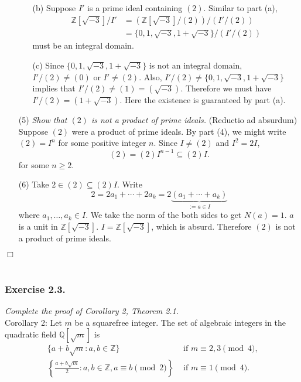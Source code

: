\documentclass{article}
\begin{document}
\begin{enumerate}
\begin{enumerate}
  \item[(b)]
    Suppose $I'$ is a prime ideal containing $(2)$.
    Similar to part (a),
    \begin{align*}
      \mathbb{Z}[\sqrt{-3}]/I'
      &= (\mathbb{Z}[\sqrt{-3}]/(2)) / (I'/(2)) \\
      &= \{ 0, 1, \sqrt{-3}, 1+\sqrt{-3} \} / (I'/(2))
    \end{align*}
    must be an integral domain.

  \item[(c)]
    Since $\{ 0, 1, \sqrt{-3}, 1+\sqrt{-3} \}$ is not an integral domain,
    $I'/(2) \neq (0)$ or $I' \neq (2)$.
    Also, $I'/(2) \neq \{ 0, 1, \sqrt{-3}, 1+\sqrt{-3} \}$ implies that
    $I'/(2) \neq (1) = (\sqrt{-3})$.
    Therefore we must have $I'/(2) = (1+\sqrt{-3})$.
    Here the existence is guaranteed by part (a).
  \end{enumerate}

\item[(5)]
\emph{Show that $(2)$ is not a product of prime ideals.}
  (Reductio ad absurdum)
  Suppose $(2)$ were a product of prime ideals.
  By part (4), we might write $(2) = I^n$ for some positive integer $n$.
  Since $I \neq (2)$ and $I^2 = 2I$,
  \[
    (2) = (2) I^{n-1} \subseteq (2) I.
  \]
  for some $n \geq 2$.

\item[(6)]
  Take $2 \in (2) \subseteq (2) I$.
  Write
  \[
    2
    = 2 a_1 + \cdots + 2 a_k
    = 2 \underbrace{(a_1 + \cdots + a_k)}_{:= a \in I}
  \]
  where $a_1, \ldots, a_k \in I$.
  We take the norm of the both sides to get $N(a) = 1$. $a$ is a unit in $\mathbb{Z}[\sqrt{-3}]$.
  $I = \mathbb{Z}[\sqrt{-3}]$, which is absurd.
  Therefore $(2)$ is not a product of prime ideals.
\end{enumerate}
$\Box$ \\\\






\subsubsection*{Exercise 2.3.}
\emph{Complete the proof of Corollary 2, Theorem 2.1.} \\

Corollary 2: Let $m$ be a squarefree integer.
The set of algebraic integers in the quadratic field $\mathbb{Q}[\sqrt{m}]$ is
\begin{align*}
    \{a + b\sqrt{m} : a, b \in \mathbb{Z} \}
        & \text{ if $m \equiv 2, 3 \pmod 4$,} \\
    \left\{ \frac{a+b\sqrt{m}}{2} : a, b \in \mathbb{Z}, a \equiv b \pmod 2\right\}
        & \text{ if $m \equiv 1 \pmod 4$.} \\
\end{align*}
\end{document}
